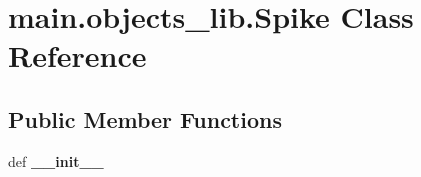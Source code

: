 \hypertarget{classmain_1_1objects__lib_1_1_spike}{\section{main.\-objects\-\_\-lib.\-Spike Class Reference}
\label{classmain_1_1objects__lib_1_1_spike}
}
\subsection*{Public Member Functions}
\begin{DoxyCompactItemize}
\item 
\hypertarget{classmain_1_1objects__lib_1_1_spike_adb235c1830eaaf58ee905fd6bca00914}{def {\bfseries \-\_\-\-\_\-init\-\_\-\-\_\-}}\label{classmain_1_1objects__lib_1_1_spike_adb235c1830eaaf58ee905fd6bca00914}

\end{DoxyCompactItemize}

